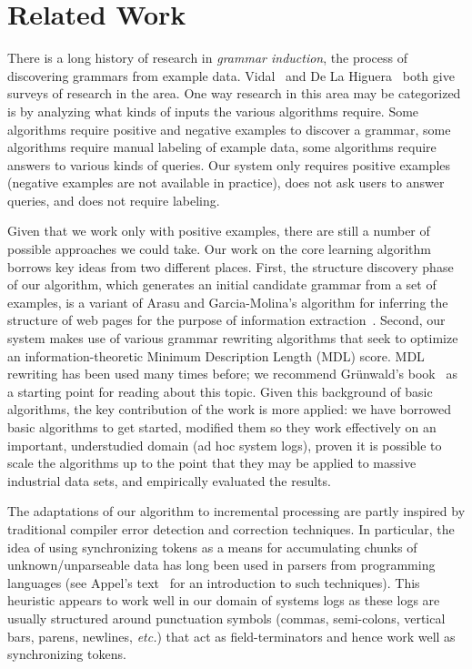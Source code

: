 \section{Related Work}
\label{sec:related}

There is a long history of research in {\em grammar induction},
the process of discovering grammars from example data.  
Vidal~\cite{vidal:gisurvey} and
De La Higuera~\cite{higuera01current} both give surveys
of research in the area.  One way  research in this area
may be categorized is by analyzing what kinds of inputs
the various algorithms require.  Some algorithms
require positive and negative examples to discover a grammar, some
algorithms require manual labeling of example data, some algorithms
require answers to various kinds of queries.  Our system only
requires positive examples (negative examples 
are not available in practice), does not ask users to answer queries,
and does not require labeling.  

Given that we work only with positive examples, there
are still a number of possible approaches we could take.
Our work on the core learning algorithm
borrows key ideas from two different places.
First, the structure discovery phase of our algorithm, which
generates an initial candidate grammar from a set of examples,
is a variant of Arasu and Garcia-Molina's algorithm 
for inferring the structure of web pages for the purpose
of information extraction~\cite{arasu+:sigmod03}.
Second, our system makes use of various grammar
rewriting algorithms that seek to optimize an information-theoretic
Minimum Description Length (MDL) score.  MDL rewriting has been
used many times before; we recommend Gr\"{u}nwald's book~\cite{mdlbook}
as a starting point for reading about this topic.
Given this background of basic algorithms, the key contribution
of the work is more applied:  we have borrowed basic algorithms to get
started, modified them so they work effectively on an important,
understudied domain (ad hoc system logs),
proven it is possible to scale the algorithms up
to the point that they may be applied to massive industrial data
sets, and empirically evaluated the results.

The adaptations of our algorithm to incremental processing 
are partly
inspired by traditional compiler error detection and correction
techniques.  In particular, the idea of using synchronizing tokens
as a means for accumulating chunks of unknown/unparseable data
has long been used in parsers from programming languages
(see Appel's text~\cite{appel:modern-compiler} for an
introduction to such techniques).  This heuristic appears to
work well in our domain of systems logs as these logs are
usually structured around punctuation symbols (commas, semi-colons,
vertical bars, parens, newlines, {\em etc.}) that act as
field-terminators and hence work well as synchronizing tokens.


